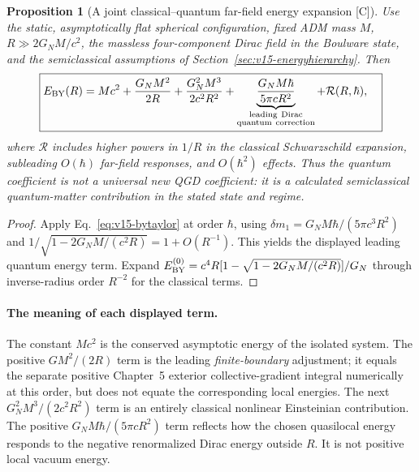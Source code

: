 \documentclass[11pt,a4paper]{article}
\newtheorem{proposition}[theorem]{Proposition}
\theoremstyle{definition}\newtheorem{definition}[theorem]{Definition}
\theoremstyle{remark}\newtheorem{remark}[theorem]{Remark}
\newcommand{\Ctag}{\textsf{[C]}}
\begin{document}
\begin{proposition}[A joint classical--quantum far-field energy expansion
\Ctag]\label{prop:v16-central}
Use the static, asymptotically flat spherical configuration, fixed ADM
mass $M$, $R\gg2G_NM/c^2$, the massless four-component Dirac field in
the Boulware state, and the semiclassical assumptions of
Section~\ref{sec:v15-energyhierarchy}. Then
\begin{equation}\label{eq:v16-central}
\boxed{\begin{aligned}
E_{\rm BY}(R)={}&Mc^2+\frac{G_NM^2}{2R}
+\frac{G_N^2M^3}{2c^2R^2}
+\underbrace{\frac{G_NM\hbar}{5\pi cR^2}}_{\substack{\mathrm{leading\ Dirac}\\\mathrm{quantum\ correction}}}
+\mathcal R(R,\hbar),
\end{aligned}}
\end{equation}
where $\mathcal R$ includes higher powers in $1/R$ in the classical
Schwarzschild expansion, subleading $O(\hbar)$ far-field responses,
and $O(\hbar^2)$ effects. Thus the quantum coefficient is\emph{ not}
a universal new QGD coefficient: it is a calculated semiclassical
quantum-matter contribution in the stated state and regime.
\end{proposition}
\begin{proof}
Apply Eq.~\eqref{eq:v15-bytaylor} at order $\hbar$, using
$\delta m_1=G_NM\hbar/(5\pi c^3R^2)$ and
$1/\sqrt{1-2G_NM/(c^2R)}=1+O(R^{-1})$. This yields the displayed
leading quantum energy term. Expand
$E_{\rm BY}^{(0)}=c^4R[1-\sqrt{1-2G_NM/(c^2R)}]/G_N$
through inverse-radius order $R^{-2}$ for the classical terms.
\end{proof}

\paragraph{The meaning of each displayed term.}
The constant $Mc^2$ is the conserved asymptotic energy of the
isolated system. The positive $GM^2/(2R)$ term is the leading
\emph{finite-boundary} adjustment; it equals the separate positive
Chapter~5 exterior collective-gradient integral numerically at
this order, but does not equate the corresponding local energies.
The next $G_N^2M^3/(2c^2R^2)$ term is an entirely classical nonlinear
Einsteinian contribution. The positive $G_NM\hbar/(5\pi cR^2)$ term
reflects how the chosen quasilocal energy responds to the negative
renormalized Dirac energy outside $R$. It is not positive local
vacuum energy.
\end{document}
